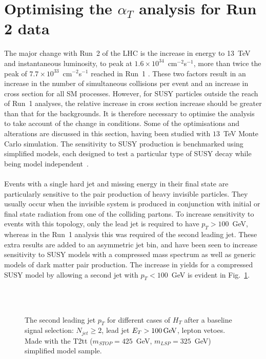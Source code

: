
\section{Optimising the \boldmath $\alpha_T$ analysis for Run 2 data}
\label{sec:analysisOptimisation}

The major change with Run~2 of the LHC is the increase in energy to 13~TeV and instantaneous luminosity, to peak at $1.6\times10^{34}$~cm$^{-2}$s$^{-1}$, more than twice the peak of $7.7\times10^{33}$~cm$^{-2}$s$^{-1}$ reached in Run~1 \cite{LHCLuminosityIPAC13}. These two factors result in an increase in the number of simultaneous collisions per event and an increase in cross section for all SM processes. However, for SUSY particles outside the reach of Run~1 analyses, the relative increase in cross section increase should be greater than that for the backgrounds. It is therefore necessary to optimise the analysis to take account of the change in conditions. Some of the optimisations and alterations are discussed in this section, having been studied with $13$~TeV Monte Carlo simulation. The sensitivity to SUSY production is benchmarked using simplified models, each designed to test a particular type of SUSY decay while being model independent~\cite{SimplifiedModelsAlves:2011wf}.
\\\\
Events with a single hard jet and missing energy in their final state are particularly sensitive to the pair production of heavy invisible particles. They usually occur when the invisible system is produced in conjunction with initial or final state radiation from one of the colliding partons. To increase sensitivity to events with this topology, only the lead jet is required to have $p_T>100$~GeV, whereas in the Run~1 analysis this was required of the second leading jet. These extra results are added to an asymmetric jet bin, and have been seen to increase sensitivity to SUSY models with a compressed mass spectrum as well as generic models of dark matter pair production. The increase in yields for a compressed SUSY model by allowing a second jet with $p_T<100$~GeV is evident in Fig.~\ref{fig:asymMotivation}.
\\\\
\begin{figure}[h!]
  \centering
  ~~
  \\
  \caption{\label{fig:asymMotivation} The second leading jet $p_T$ for different
  cases of $H_T$ after a baseline signal selection: $N_{jet}\geq2$, lead jet
  $E_T>100\mathrm{\,Ge\kern -0.1em V}$, lepton vetoes. Made with the T2tt ($m_{STOP}=425$~GeV, $m_{LSP}=325$~GeV) simplified model sample.}
\end{figure}

